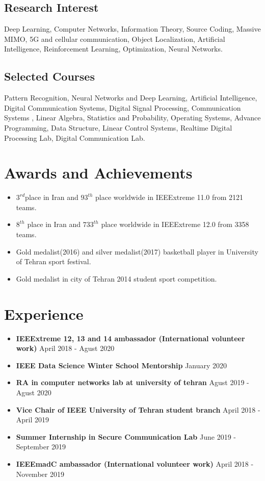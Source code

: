 \documentclass[11pt,a4paper,roman]{moderncv}        %
\begin{document}
\subsection{Research Interest}
Deep Learning, Computer Networks, Information Theory, Source Coding, Massive MIMO, 5G and cellular communication, Object Localization, Artificial Intelligence, Reinforcement Learning, Optimization, Neural Networks.


\subsection{Selected Courses}
		Pattern Recognition,
		Neural Networks and Deep Learning, 
		Artificial Intelligence, 
		Digital Communication Systems, 
		Digital Signal Processing, 
		Communication Systems , 
		Linear Algebra, 
		Statistics and Probability, 
		Operating Systems, 
		Advance Programming, 
		Data Structure, 
		Linear Control Systems, 
		Realtime Digital Processing Lab, 
		Digital Communication Lab. 
\section{Awards and Achievements}
\begin{minipage}{\maincolumnwidth}%
	\small{
		\begin{itemize}
			\item $3^{rd}$place in Iran and $93^{th}$ place worldwide in IEEExtreme 11.0 from 2121 teams.
			\item $8^{th}$ place in Iran and $733^{th}$ place worldwide in IEEExtreme 12.0 from 3358 teams. 
			\item Gold medalist(2016) and silver medalist(2017) basketball player in University of Tehran sport festival.
			\item Gold medalist in city of Tehran 2014 student sport competition.
	\end{itemize}}%
\end{minipage}%

\section{Experience}

\begin{itemize}
		\item \textbf{IEEExtreme 12, 13 and 14 ambassador (International volunteer work)} \hfill {April 2018 - Agust 2020}
		\item \textbf{IEEE Data Science Winter School Mentorship} \hfill {January 2020}
		\item \textbf{RA in computer networks lab at university of tehran} \hfill {Agust 2019 - Agust 2020}
		\item \textbf{Vice Chair of IEEE University of Tehran student branch} \hfill {April 2018 - April 2019}
		\item \textbf{Summer Internship in Secure Communication Lab} \hfill {June 2019 - September 2019}
		\item \textbf{IEEEmadC ambassador (International volunteer work)} \hfill {April 2018 - November 2019}

\end{itemize}
\end{document}
